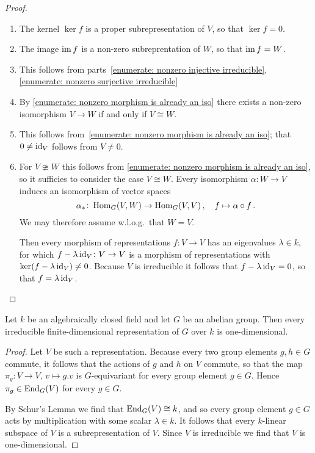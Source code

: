 \begin{proof}
  \leavevmode
  \begin{enumerate}
    \item
      The kernel $\ker f$ is a proper subrepresentation of $V$, so that $\ker f = 0$.
    \item
      The image $\operatorname{im} f$ is a non-zero subreprentation of $W$, so that $\operatorname{im} f = W$.
    \item 
      This follows from parts~\ref*{enumerate: nonzero injective irreducible}, \ref*{enumerate: nonzero surjective irreducible}
    \item
      By \ref*{enumerate: nonzero morphism is already an iso} there exists a non-zero isomorphism $V \to W$ if and only if $V \cong W$.
    \item
      This follows from~\ref*{enumerate: nonzero morphism is already an iso};
      that $0 \neq \operatorname{id}_V$ follows from $V \neq 0$.
    \item
      For $V \ncong W$ this follows from \ref*{enumerate: nonzero morphism is already an iso}, so it sufficies to consider the case $V \cong W$.
      Every isomorphism $\alpha \colon W \to V$ induces an isomorphism of vector spaces
      \[
                \alpha_*
        \colon  \operatorname{Hom}_G(V,W)
        \to     \operatorname{Hom}_G(V,V) \,,
        \quad   f
        \mapsto \alpha \circ f \,.
      \]
      We may therefore assume w.l.o.g.\ that $W = V$.
      
      Then every morphism of representations $f \colon V \to V$ has an eigenvalues $\lambda \in k$, for which $f - \lambda \operatorname{id}_V \colon V \to V$ is a morphism of representations with $\ker(f - \lambda \operatorname{id}_V) \neq 0$.
      Because $V$ is irreducible it follows that $f - \lambda \operatorname{id}_V = 0$, so that $f = \lambda \operatorname{id}_V$.
  \qedhere
  \end{enumerate}
\end{proof}


\begin{corollary}
  \label{corollary: irreducible representation of abelian groups}
  Let $k$ be an algebraically closed field and let $G$ be an abelian group.
  Then every irreducible finite-dimensional representation of $G$ over $k$ is one-dimensional.
\end{corollary}


\begin{proof}
  Let $V$ be such a representation.
  Because every two group elements $g, h \in G$ commute, it follows that the actions of $g$ and $h$ on $V$ commute, so that the map $\pi_g \colon V \to V$, $v \mapsto g.v$ is $G$-equivariant for every group element $g \in G$.
  Hence $\pi_g \in \operatorname{End}_G(V)$ for every $g \in G$.
  
  By Schur’s Lemma we find that $\operatorname{End}_G(V) \cong k$, and so every group element $g \in G$ acts by multiplication with some scalar $\lambda \in k$.
  It follows that every $k$-linear subspace of $V$ is a subrepresentation of $V$.
  Since $V$ is irreducible we find that $V$ is one-dimensional.
\end{proof}


